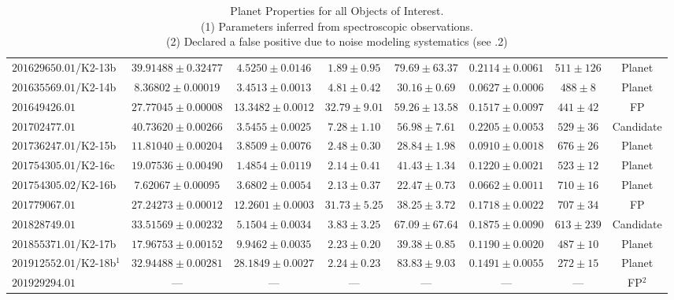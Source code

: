 \begin{landscape}
\begin{table}[hbt!]
\begin{center}
\begin{tabular}{lccccccc}
$201629650.01$/K2-13b & $39.91488 \pm {0.32477}$ & $4.5250 \pm {0.0146}$ & $1.89 \pm {0.95}$ & $79.69 \pm {63.37}$ & $0.2114 \pm {0.0061}$ & $511 \pm {126} $   & Planet \\
$201635569.01$/K2-14b & $8.36802 \pm {0.00019}$ & $3.4513 \pm {0.0013}$ & $4.81 \pm {0.42}$ & $30.16 \pm {0.69}$ & $0.0627 \pm {0.0006}$ & $488 \pm {8} $       & Planet \\
$201649426.01$ & $27.77045 \pm {0.00008}$ & $13.3482 \pm {0.0012}$ & $32.79 \pm {9.01}$ & $59.26 \pm {13.58}$ & $0.1517 \pm {0.0097}$ & $441 \pm {42} $  & FP \\
$201702477.01$ & $40.73620 \pm {0.00266}$ & $3.5455 \pm {0.0025}$ & $7.28 \pm {1.10}$ & $56.98 \pm {7.61}$ & $0.2205 \pm {0.0053}$ & $529 \pm {36} $     & Candidate \\
$201736247.01$/K2-15b & $11.81040 \pm {0.00204}$ & $3.8509 \pm {0.0076}$ & $2.48 \pm {0.30}$ & $28.84 \pm {1.98}$ & $0.0910 \pm {0.0018}$ & $676 \pm {26} $     & Planet \\
$201754305.01$/K2-16c & $19.07536 \pm {0.00490}$ & $1.4854 \pm {0.0119}$ & $2.14 \pm {0.41}$ & $41.43 \pm {1.34}$ & $0.1220 \pm {0.0021}$ & $523 \pm {12} $     & Planet \\
$201754305.02$/K2-16b & $7.62067 \pm {0.00095}$ & $3.6802 \pm {0.0054}$ & $2.13 \pm {0.37}$ & $22.47 \pm {0.73}$ & $0.0662 \pm {0.0011}$ & $710 \pm {16} $      & Planet \\
$201779067.01$ & $27.24273 \pm {0.00012}$ & $12.2601 \pm {0.0003}$ & $31.73 \pm {5.25}$ & $38.25 \pm {3.72}$ & $0.1718 \pm {0.0022}$ & $707 \pm {34} $   & FP \\
$201828749.01$ & $33.51569 \pm {0.00232}$ & $5.1504 \pm {0.0034}$ & $3.83 \pm {3.25}$ & $67.09 \pm {67.64}$ & $0.1875 \pm {0.0090}$ & $613 \pm {239} $   & Candidate \\
$201855371.01$/K2-17b & $17.96753 \pm {0.00152}$ & $9.9462 \pm {0.0035}$ & $2.23 \pm {0.20}$ & $39.38 \pm {0.85}$ & $0.1190 \pm {0.0020}$ & $487 \pm {10} $     & Planet \\
$201912552.01$/K2-18b$^1$ & $32.94488 \pm {0.00281}$ & $28.1849 \pm {0.0027}$ & $2.24 \pm {0.23}$ & $83.83 \pm {9.03}$ & $0.1491 \pm {0.0055}$ & $272 \pm {15}$ & Planet \\
$201929294.01$ & --- & --- & --- & --- & --- & --- & FP$^2$\\
\hline
\end{tabular}
\caption[Planet properties for all Objects of Interest]{Planet Properties for all Objects of Interest. \\
(1) Parameters inferred from spectroscopic observations. \\
(2) Declared a false positive due to noise modeling systematics (see .2)}
\end{center}
\label{Tab:Planets}
\end{table}
\end{landscape}
\clearpage
